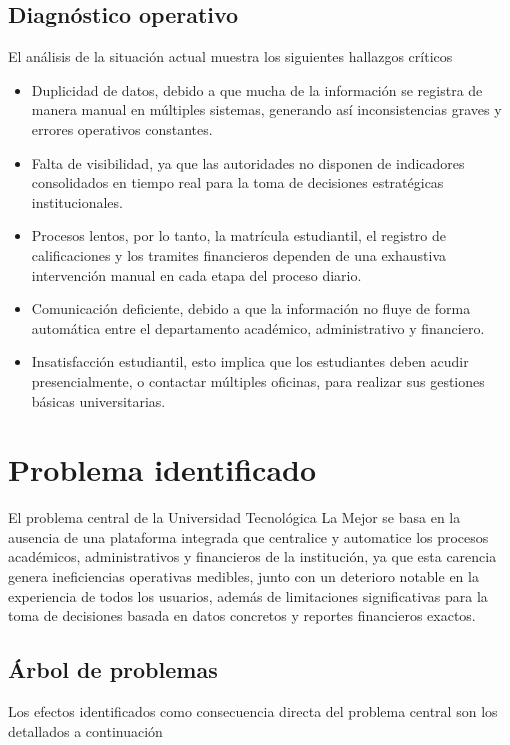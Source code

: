 \documentclass[11pt,spanish]{article}
\begin{document}
\subsection{Diagnóstico operativo}

El análisis de la situación actual muestra los siguientes hallazgos críticos

\begin{itemize}
    \item Duplicidad de datos, debido a que mucha de la información se registra de manera manual en múltiples sistemas, generando así inconsistencias graves y errores operativos constantes.
    \item Falta de visibilidad, ya que las autoridades no disponen de indicadores consolidados en tiempo real para la toma de decisiones estratégicas institucionales.
    \item Procesos lentos, por lo tanto, la matrícula estudiantil, el registro de calificaciones y los tramites financieros dependen de una exhaustiva intervención manual en cada etapa del proceso diario.
    \item Comunicación deficiente, debido a que la información no fluye de forma automática entre el departamento académico, administrativo y financiero.
    \item Insatisfacción estudiantil, esto implica que los estudiantes deben acudir presencialmente, o contactar múltiples oficinas, para realizar sus gestiones básicas universitarias.
\end{itemize}

\section{Problema identificado}

El problema central de la Universidad Tecnológica La Mejor se basa en la ausencia de una plataforma integrada que centralice y automatice los procesos académicos, administrativos y financieros de la institución, ya que esta carencia genera ineficiencias operativas medibles, junto con un deterioro notable en la experiencia de todos los usuarios, además de limitaciones significativas para la toma de decisiones basada en datos concretos y reportes financieros exactos.

\subsection{Árbol de problemas}

Los efectos identificados como consecuencia directa del problema central son los detallados a continuación
\end{document}
